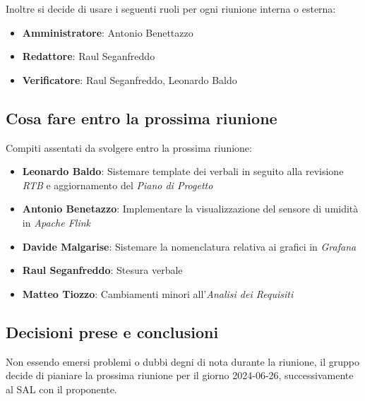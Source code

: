 \documentclass[italian,12pt]{article}
\begin{document}
Inoltre si decide di usare i seguenti ruoli per ogni riunione interna o esterna:
\begin{itemize}
	\item \textbf{Amministratore}: Antonio Benettazzo
	\item \textbf{Redattore}: Raul Seganfreddo
	\item \textbf{Verificatore}: Raul Seganfreddo, Leonardo Baldo
\end{itemize}

\subsection{Cosa fare entro la prossima riunione}
Compiti assentati da svolgere entro la prossima riunione:
\begin{itemize}
	\item \textbf{Leonardo Baldo}: Sistemare template dei verbali in seguito alla revisione \textit{RTB} e aggiornamento del \textit{Piano di Progetto}
	\item \textbf{Antonio Benetazzo}: Implementare la visualizzazione del sensore di umidità in \textit{Apache Flink}
	\item \textbf{Davide Malgarise}: Sistemare la nomenclatura relativa ai grafici in \textit{Grafana}
	\item \textbf{Raul Seganfreddo}: Stesura verbale
	\item \textbf{Matteo Tiozzo}: Cambiamenti minori all'\textit{Analisi dei Requisiti}
\end{itemize}

\subsection{Decisioni prese e conclusioni}
Non essendo emersi problemi o dubbi degni di nota durante la riunione, il gruppo decide di pianiare la prossima
riunione per il giorno 2024-06-26, successivamente al SAL con il proponente.
\end{document}
